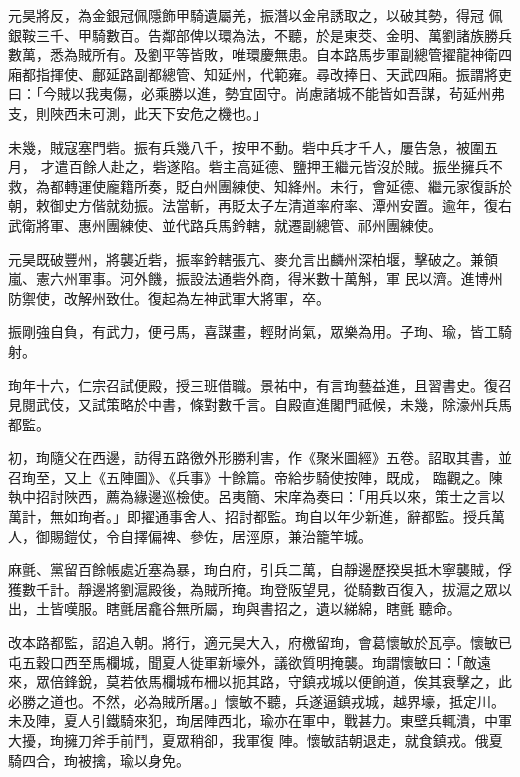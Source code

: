 \begin{pinyinscope}
 元昊將反，為金銀冠佩隱飾甲騎遺屬羌，振潛以金帛誘取之，以破其勢，得冠
 佩銀鞍三千、甲騎數百。告鄰部俾以環為法，不聽，於是東茭、金明、萬劉諸族勝兵數萬，悉為賊所有。及劉平等皆敗，唯環慶無患。自本路馬步軍副總管擢龍神衛四廂都指揮使、鄜延路副都總管、知延州，代範雍。尋改捧日、天武四廂。振謂將吏曰：「今賊以我夷傷，必乘勝以進，勢宜固守。尚慮諸城不能皆如吾謀，茍延州弗支，則陜西未可測，此天下安危之機也。」



 未幾，賊寇塞門砦。振有兵幾八千，按甲不動。砦中兵才千人，屢告急，被圍五月，
 才遣百餘人赴之，砦遂陷。砦主高延德、鹽押王繼元皆沒於賊。振坐擁兵不救，為都轉運使龐籍所奏，貶白州團練使、知絳州。未行，會延德、繼元家復訴於朝，敕御史方偕就劾振。法當斬，再貶太子左清道率府率、潭州安置。逾年，復右武衛將軍、惠州團練使、並代路兵馬鈐轄，就遷副總管、祁州團練使。



 元昊既破豐州，將襲近砦，振率鈐轄張亢、麥允言出麟州深柏堰，擊破之。兼領嵐、憲六州軍事。河外饑，振設法通砦外商，得米數十萬斛，軍
 民以濟。進博州防禦使，改解州致仕。復起為左神武軍大將軍，卒。



 振剛強自負，有武力，便弓馬，喜謀畫，輕財尚氣，眾樂為用。子珣、瑜，皆工騎射。



 珣年十六，仁宗召試便殿，授三班借職。景祐中，有言珣藝益進，且習書史。復召見閱武伎，又試策略於中書，條對數千言。自殿直進閣門祗候，未幾，除濠州兵馬都監。



 初，珣隨父在西邊，訪得五路徼外形勝利害，作《聚米圖經》五卷。詔取其書，並召珣至，又上《五陣圖》、《兵事》十餘篇。帝給步騎使按陣，既成，
 臨觀之。陳執中招討陜西，薦為緣邊巡檢使。呂夷簡、宋庠為奏曰：「用兵以來，策士之言以萬計，無如珣者。」即擢通事舍人、招討都監。珣自以年少新進，辭都監。授兵萬人，御賜鎧仗，令自擇偏裨、參佐，居涇原，兼治籠竿城。



 麻氈、黨留百餘帳處近塞為暴，珣白府，引兵二萬，自靜邊歷揆吳抵木寧襲賊，俘獲數千計。靜邊將劉滬殿後，為賊所掩。珣登阪望見，從騎數百復入，拔滬之眾以出，土皆嘆服。瞎氈居龕谷無所屬，珣與書招之，遺以綈綿，瞎氈
 聽命。



 改本路都監，詔追入朝。將行，適元昊大入，府檄留珣，會葛懷敏於瓦亭。懷敏已屯五穀口西至馬欄城，聞夏人徙軍新壕外，議欲質明掩襲。珣謂懷敏曰：「敵遠來，眾倍鋒銳，莫若依馬欄城布柵以扼其路，守鎮戎城以便餉道，俟其衰擊之，此必勝之道也。不然，必為賊所屠。」懷敏不聽，兵遂逼鎮戎城，越界壕，抵定川。未及陣，夏人引鐵騎來犯，珣居陣西北，瑜亦在軍中，戰甚力。東壁兵輒潰，中軍大擾，珣擁刀斧手前鬥，夏眾稍卻，我軍復
 陣。懷敏詰朝退走，就食鎮戎。俄夏騎四合，珣被擒，瑜以身免。




\end{pinyinscope}
